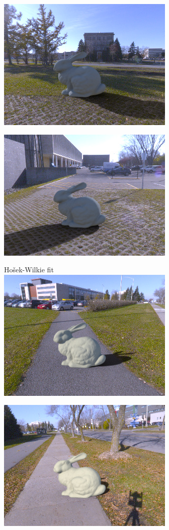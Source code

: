\begin{minipage}{\linewidth}
\begin{multicols}{4}
\includegraphics[width=\mywidth]{AG8A2917_Panorama_hdr-corrected_007.jpg}

\includegraphics[width=\mywidth]{AG8A2917_Panorama_hdr-corrected_015.jpg}


\vfill\null
\columnbreak

Hošek-Wilkie fit\\

\includegraphics[width=\mywidth]{AG8A2749_Panorama_hdr-corrected_004.jpg}

\includegraphics[width=\mywidth]{AG8A2791_Panorama_hdr-corrected_002.jpg}


\end{multicols}
\end{minipage}
